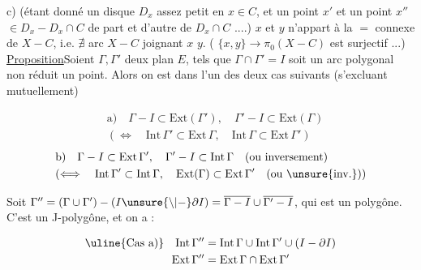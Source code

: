 c) (étant donné un disque $D_x$ assez petit  en $x\in C$\unsure{\}|)}, et un point $x'$ et un point $x''$ $\in D_x-D_x\cap C$ de part et d'autre de $D_x\cap C$ ....)
$x$ et $y$ n'appart  à la $=$  connexe de $X-C$, i.e. $\nexists$ arc  $X-C$ joignant $x$  $y$.
( $\{x,y\}\longrightarrow\pi_0(X-C)$ est surjectif ...)
\uline{Proposition}\qquad Soient $\Gamma,\Gamma'$ deux   plan $E$, tels que $\Gamma\cap\Gamma'=I$ soit un arc polygonal non réduit  un point. Alors on est dans l'un des deux cas suivants (s'excluant mutuellement)

\[
\begin{aligned}
 &\mathrm{a)}\quad \Gamma-I\subset\mathrm{Ext}(\Gamma'),\quad
 \Gamma'-I\subset\mathrm{Ext}(\Gamma)\\
 &(\Longleftrightarrow\quad \mathrm{Int}\,\Gamma'\subset\mathrm{Ext}\,\Gamma,\quad
 \mathrm{Int}\,\Gamma\subset\mathrm{Ext}\,\Gamma')
\end{aligned}
\]
\[
\begin{aligned}
 &\mathrm{b)}\quad\Gamma-I\subset\mathrm{Ext}\,\Gamma',\quad
 \Gamma'-I\subset\mathrm{Int}\,\Gamma\quad \text{(ou inversement)}\\
 &(\Longleftrightarrow\quad \mathrm{Int}\,\Gamma'\subset\mathrm{Int}\,\Gamma,\quad
 \mathrm{Ext}(\Gamma)\subset\mathrm{Ext}\,\Gamma'\quad \text{(ou \unsure{inv.})})
\end{aligned}
\]

Soit $\Gamma''=(\Gamma\cup\Gamma')-(I\unsure{\setminus|-}\partial I)
=\overline{\Gamma-I}\cup\overline{\Gamma'-I}$, qui est un polygône.
C'est un J-polygône, et on a :

\[
\begin{aligned}
 \text{\uline{Cas a)}}\quad \mathrm{Int}\,\Gamma''&=\mathrm{Int}\,\Gamma\cup\mathrm{Int}\,\Gamma'\cup(I-\partial I)\\
 \mathrm{Ext}\,\Gamma''&=\mathrm{Ext}\,\Gamma\cap\mathrm{Ext}\,\Gamma'
\end{aligned}
\]
\noindent{}

